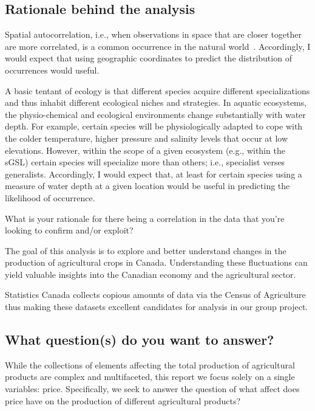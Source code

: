 \subsection{Rationale behind the analysis}

Spatial autocorrelation, i.e., when observations in space that are closer together are more correlated, is a common occurrence in the natural world~\cite{spac_wiki}.
Accordingly, I would expect that using geographic coordinates to predict the distribution of occurrences would useful.

A basic tentant of ecology is that different species acquire different specializations and thus inhabit different ecological niches and strategies.
In aquatic ecosystems, the physio-chemical and ecological environments change substantially with water depth.
For example, certain species will be physiologically adapted to cope with the colder temperature, higher pressure and salinity levels that occur at low elevations.
However, within the scope of a given ecosystem (e.g., within the sGSL) certain species will specialize more than others; i.e., specialist verses generalists.
Accordingly, I would expect that,  at least for certain species using a measure of water depth at a given location would be useful in predicting the likelihood of occurrence.



What is your rationale for there being a correlation in the data that you’re looking to confirm and/or exploit?


The goal of this analysis is to explore and better understand changes in the production of agricultural crops in Canada.
Understanding these fluctuations can yield valuable insights into the Canadian economy and the agricultural sector.

Statistics Canada collects copious amounts of data via the Census of Agriculture~\cite{census} thus making these datasets excellent candidates for analysis in our group project.

\subsection{What question(s) do you want to answer?}

While the collections of elements affecting the total production of agricultural products are complex and multifaceted, this report we focus solely on a single variables: price.
Specifically, we seek to answer the question of what affect does price have on the production of different agricultural products?

